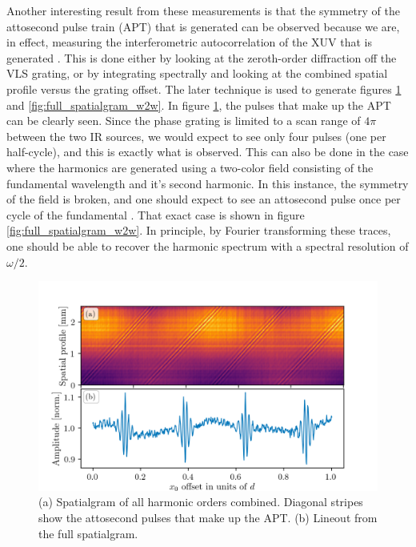 Another interesting result from these measurements is that the symmetry of the attosecond pulse train (APT) that is generated can be observed because we are, in effect, measuring the interferometric autocorrelation of the XUV that is generated \cite{nabekawaInterferometryAttosecondPulse2013, nabekawaInterferometricAutocorrelationAttosecond2008, mengInterferometricTimeDelay2016, kovacevExtremeUltravioletFourierTransform2005}.  This is done either by looking at the zeroth-order diffraction off the VLS grating, or by integrating spectrally and looking at the combined spatial profile versus the grating offset.  The later technique is used to generate figures \ref{fig:full_spatialgram} and \ref{fig:full_spatialgram_w2w}.  In figure \ref{fig:full_spatialgram}, the pulses that make up the APT can be clearly seen.  Since the phase grating is limited to a scan range of $4\pi$ between the two IR sources, we would expect to see only four pulses (one per half-cycle), and this is exactly what is observed.  This can also be done in the case where the harmonics are generated using a two-color field consisting of the fundamental wavelength and it's second harmonic.  In this instance, the symmetry of the field is broken, and one should expect to see an attosecond pulse once per cycle of the fundamental \cite{kimHighlyEfficientHighHarmonic2005, dudovichSubcycleSpatialMapping2009, dudovichMeasuringControllingBirth2006}.  That exact case is shown in figure \ref{fig:full_spatialgram_w2w}.  In principle, by Fourier transforming these traces, one should be able to recover the harmonic spectrum with a spectral resolution of $\omega/2$.
\begin{figure}
	\centering
	\includegraphics[width=1.0\textwidth]{figures/Two_source/full_spatialgram.png}
	\caption{(a) Spatialgram of all harmonic orders combined. Diagonal stripes show the attosecond pulses that make up the APT. (b) Lineout from the full spatialgram.  }
	\label{fig:full_spatialgram}
\end{figure}
